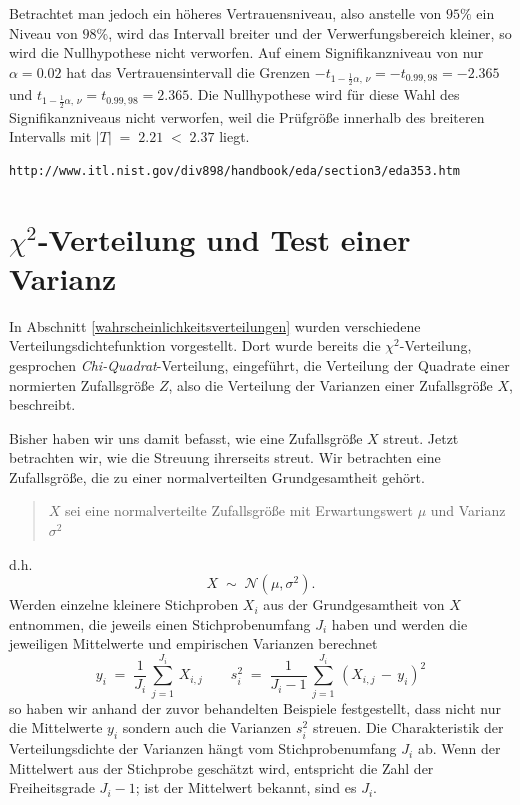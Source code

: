 Betrachtet man jedoch ein höheres Vertrauensniveau, also anstelle von $95 \%$ ein
Niveau von $98 \%$, wird das Intervall breiter und der Verwerfungsbereich kleiner, so
wird die Nullhypothese nicht verworfen. Auf einem Signifikanzniveau von nur
$\alpha = 0.02$ hat das Vertrauensintervall die Grenzen
$-t_{1-\frac{1}{2} \alpha, \, \nu} = -t_{0.99, 98} = -2.365$ und
$t_{1-\frac{1}{2} \alpha, \, \nu} = t_{0.99, 98} = 2.365$. Die
Nullhypothese wird für diese Wahl des Signifikanzniveaus nicht verworfen,
weil die Prüfgröße innerhalb des breiteren Intervalls mit
$|T| \; = \; 2.21 \; < \; 2.37$ liegt.

\begin{verbatim}
http://www.itl.nist.gov/div898/handbook/eda/section3/eda353.htm
\end{verbatim}

\section{\label{sec:chiquadrat}$\chi^2$-Verteilung und Test einer Varianz}


In Abschnitt \ref{wahrscheinlichkeitsverteilungen} wurden verschiedene Verteilungsdichtefunktion vorgestellt.
Dort wurde bereits die $\chi^2$-Verteilung, gesprochen \textsl{Chi-Quadrat}-Verteilung, eingeführt,
die Verteilung der Quadrate einer normierten Zufallsgröße $Z$,
also die Verteilung der Varianzen einer Zufallsgröße $X$, beschreibt.


Bisher haben wir uns damit befasst, wie eine Zufallsgröße $X$ streut.
Jetzt betrachten wir, wie die Streuung ihrerseits streut.
Wir betrachten eine Zufallsgröße, die zu einer normalverteilten Grundgesamtheit gehört.
\begin{quote}
$X$ sei eine normalverteilte Zufallsgröße mit Erwartungswert $\mu$ und Varianz $\sigma^2$
\end{quote}
d.h.
\begin{equation}
X \; \sim \; \mathcal{N}(\mu, \sigma^2).
\end{equation}
Werden einzelne kleinere Stichproben $X_i$ aus der Grundgesamtheit von $X$ entnommen, die
jeweils einen Stichprobenumfang $J_i$ haben und werden die jeweiligen Mittelwerte und
empirischen Varianzen berechnet
\begin{equation}
y_i \; = \; \frac{1}{J_i} \, \sum_{j=1}^{J_i} \, X_{i,j} \qquad
 s_i^2 \; = \; \frac{1}{J_i-1} \, \sum_{j=1}^{J_i} \, (X_{i,j} \, - \, y_i)^2
\end{equation}
so haben wir anhand der zuvor behandelten Beispiele festgestellt,
dass nicht nur die Mittelwerte $y_i$ sondern auch die Varianzen $s_i^2$ streuen.
Die Charakteristik der Verteilungsdichte der Varianzen hängt vom
Stichprobenumfang $J_i$ ab. Wenn der Mittelwert aus der Stichprobe geschätzt wird,
entspricht die Zahl der Freiheitsgrade $J_i-1$; ist der Mittelwert bekannt, sind es $J_i$.

